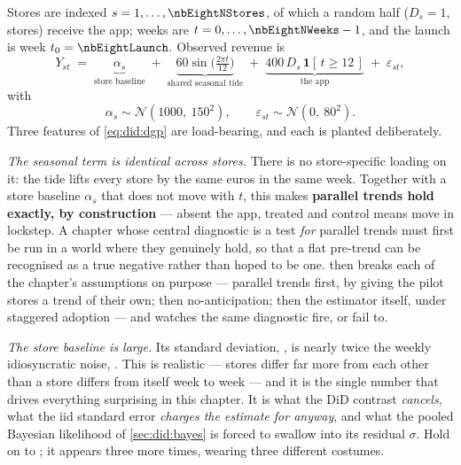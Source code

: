 Stores are indexed $s = 1, \dots, \nbEightNStores$, of which a random half ($D_s = 1$,
\nbEightNTreated{} stores) receive the app; weeks are $t = 0, \dots, \nbEightNWeeks - 1$, and the
launch is week $t_0 = \nbEightLaunch$. Observed revenue is
%
\begin{equation}
  Y_{st}
  \;=\;
  \underbrace{\alpha_s}_{\text{store baseline}}
  \;+\;
  \underbrace{60 \sin\!\Big(\tfrac{2\pi t}{12}\Big)}_{\text{shared seasonal tide}}
  \;+\;
  \underbrace{400 \, D_s \, \mathbf 1[\,t \ge 12\,]}_{\text{the app}}
  \;+\;
  \varepsilon_{st},
  \label{eq:did:dgp}
\end{equation}
%
with
%
\begin{equation}
  \alpha_s \sim \mathcal N\!\left(1000,\ 150^{2}\right),
  \qquad
  \varepsilon_{st} \sim \mathcal N\!\left(0,\ 80^{2}\right).
  \label{eq:did:dgpnoise}
\end{equation}
%
Three features of \cref{eq:did:dgp} are load-bearing, and each is planted deliberately.

\emph{The seasonal term is identical across stores.} There is no store-specific loading on it: the
tide lifts every store by the same euros in the same week. Together with a store baseline
$\alpha_s$ that does not move with $t$, this makes \textbf{parallel trends hold exactly, by
construction} --- absent the app, treated and control means move in lockstep. A chapter whose
central diagnostic is a test \emph{for} parallel trends must first be run in a world where they
genuinely hold, so that a flat pre-trend can be recognised as a true negative rather than hoped to
be one.  then breaks each of the chapter's assumptions on purpose --- parallel
trends first, by giving the pilot stores a trend of their own; then no-anticipation; then the
estimator itself, under staggered adoption --- and watches the same diagnostic fire, or fail to.

\emph{The store baseline is large.} Its standard deviation, \eur{\nbEightAlphaSd}, is nearly twice
the weekly idiosyncratic noise, \eur{\nbEightNoiseSd}. This is realistic --- stores differ far more
from each other than a store differs from itself week to week --- and it is the single number that
drives everything surprising in this chapter. It is what the DiD contrast \emph{cancels}, what the
iid standard error \emph{charges the estimate for anyway}, and what the pooled Bayesian likelihood
of \cref{sec:did:bayes} is forced to swallow into its residual $\sigma$. Hold on to
\eur{\nbEightAlphaSd}; it appears three more times, wearing three different costumes.

